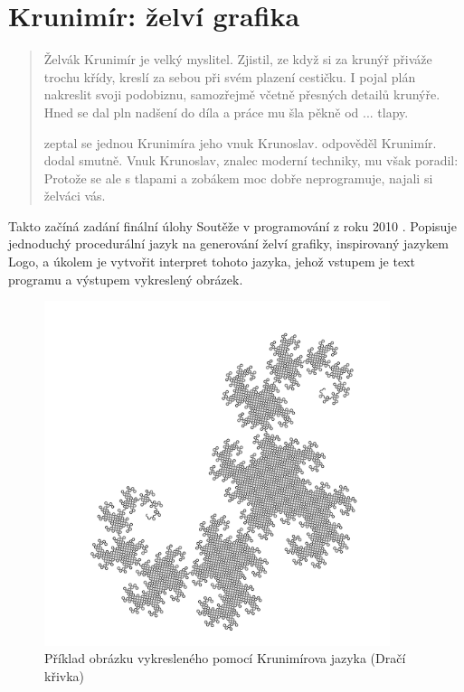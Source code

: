 \chapter{Krunimír: želví grafika}

\begin{quotation}

Želvák Krunimír je velký myslitel. Zjistil, ze když si za krunýř přiváže trochu
křídy, kreslí za sebou při svém plazení cestičku. I pojal plán nakreslit svoji
podobiznu, samozřejmě včetně přesných detailů krunýře. Hned se dal pln nadšení
do díla a práce mu šla pěkně od ... tlapy.

 zeptal se jednou Krunimíra jeho vnuk Krunoslav.
 odpověděl Krunimír.  dodal smutně.   Vnuk Krunoslav, znalec moderní techniky, mu
však poradil: 
Protože se ale s tlapami a zobákem moc dobře neprogramuje, najali si želváci
vás.
\end{quotation}

Takto začíná zadání finální úlohy Soutěže v programování z roku
2010 \cite{krunimir-task}. Popisuje jednoduchý procedurální jazyk na generování
želví grafiky, inspirovaný jazykem Logo, a úkolem je vytvořit interpret tohoto
jazyka, jehož vstupem je text programu a výstupem vykreslený obrázek. 

\begin{figure}
  \includegraphics[width=0.9\textwidth]{krunimir/examples/dragon}
  \caption{Příklad obrázku vykresleného pomocí Krunimírova jazyka (Dračí křivka)}
  \label{fig:krunimir-dragon}
\end{figure}

